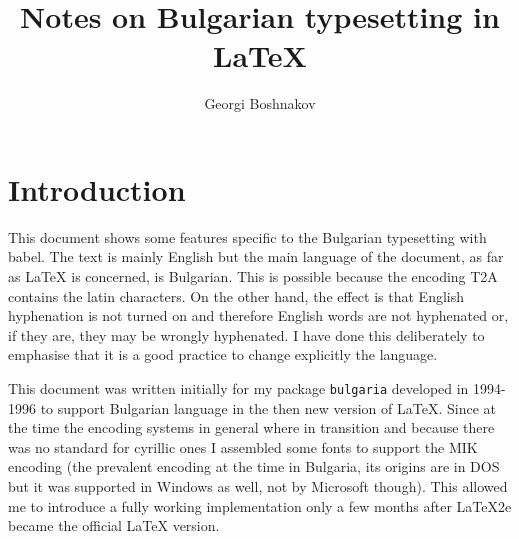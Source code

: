 \documentclass[12pt,a4paper,twosided]{article}
\title{Notes on Bulgarian typesetting in \LaTeX }
\author{Georgi Boshnakov}
\begin{document}












\maketitle

\tableofcontents

\section{Introduction} \label{sec:intro}


This document shows some features specific to the Bulgarian typesetting with babel.
The text is mainly English but the main language of the document, as far as \LaTeX{} is
concerned, is Bulgarian. This is possible because the encoding T2A  contains the latin
characters. On the other hand, the effect is that English hyphenation is not turned on and
therefore English words are not hyphenated or, if they are, they may be wrongly hyphenated. 
I have done this deliberately to emphasise that it is a good practice to change explicitly
the language.

This document was written initially for my package \texttt{bulgaria} developed in 1994-1996 to
support Bulgarian language in the then new version of \LaTeX. Since at the time the encoding
systems in general where in transition and because there was no standard for cyrillic ones I
assembled some fonts to support the MIK encoding (the prevalent encoding at the time in
Bulgaria, its origins are in DOS but it was supported in Windows as well, not by Microsoft
though). This allowed me to introduce a fully working implementation only a few months after
\LaTeX2e{} became the official \LaTeX{} version.
\end{document}
